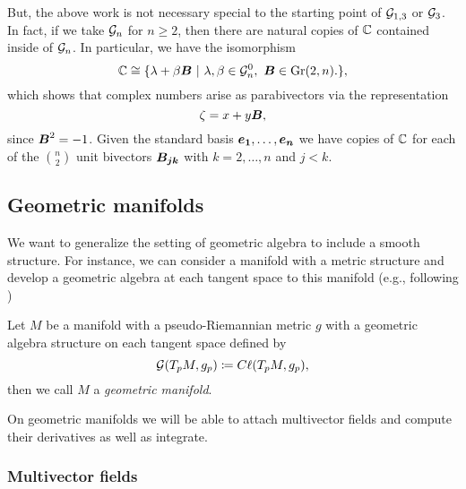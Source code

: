 But, the above work is not necessary special to the starting point of $\mathcal{G}_{1,3}$ or $\mathcal{G}_3$. In fact, if we take $\mathcal{G}_n$ for $n\geq 2$, then there are natural copies of $\mathbb{C}$ contained inside of $\mathcal{G}_n$. In particular, we have the isomorphism
\begin{equation}
    \mathbb{C} \cong \{\lambda + \beta \boldsymbol{B} ~\vert~ \lambda,\beta \in \mathcal{G}_n^0,~ \boldsymbol{B} \in \operatorname{Gr}(2,n). \},
\end{equation}
which shows that complex numbers arise as parabivectors via the representation
\begin{equation}
        \zeta = x + y\boldsymbol{B},
\end{equation}
since $\boldsymbol{B}^2=-1$. Given the standard basis $\boldsymbol{e_1},\dots,\boldsymbol{e_n}$ we have copies of $\mathbb{C}$ for each of the ${ n \choose 2}$ unit bivectors $\boldsymbol{B_{jk}}$ with $k=2,\dots,n$ and $j<k$.





\subsection{Geometric manifolds}

We want to generalize the setting of geometric algebra to include a smooth structure. For instance, we can consider a manifold with a metric structure and develop a geometric algebra at each tangent space to this manifold (e.g., following \cite{schindler_geometric_2020})
\begin{definition}
Let $M$ be a manifold with a pseudo-Riemannian metric $g$ with a geometric algebra structure on each tangent space defined by
\begin{equation}
\mathcal{G}(T_pM,g_p)\coloneqq C\ell(T_pM,g_p),
\end{equation}
then we call $M$ a \emph{geometric manifold}.
\end{definition}
On geometric manifolds we will be able to attach multivector fields and compute their derivatives as well as integrate. 

\subsubsection{Multivector fields}

